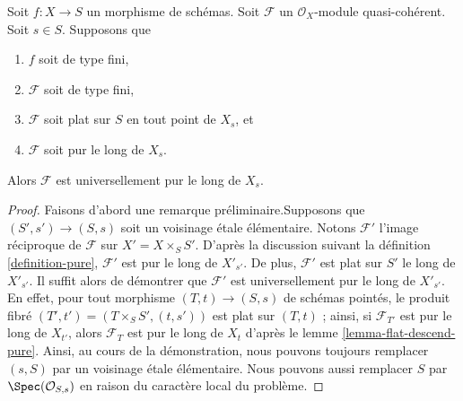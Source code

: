 \begin{lemma}
\label{lemma-finite-type-flat-pure-along-fibre-is-universal}
Soit $f : X \to S$ un morphisme de schémas.
Soit $\mathcal{F}$ un $\mathcal{O}_X$-module quasi-cohérent.
Soit $s \in S$.
Supposons que
\begin{enumerate}
\item $f$ soit de type fini,
\item $\mathcal{F}$ soit de type fini,
\item $\mathcal{F}$ soit plat sur $S$ en tout point de $X_s$, et
\item $\mathcal{F}$ soit pur le long de $X_s$.
\end{enumerate}
Alors $\mathcal{F}$ est universellement pur le long de $X_s$.
\end{lemma}

\begin{proof}
Faisons d'abord une remarque préliminaire.\newline Supposons que $(S', s') \to (S, s)$
soit un voisinage \'etale élémentaire. Notons $\mathcal{F}'$
l'image réciproque de $\mathcal{F}$ sur $X' = X \times_S S'$.
D'après la discussion suivant la
définition \ref{definition-pure},
$\mathcal{F}'$ est pur le long de $X'_{s'}$. De plus, $\mathcal{F}'$
est plat sur $S'$ le long de $X'_{s'}$. Il suffit alors de démontrer
que $\mathcal{F}'$ est universellement pur le long de $X'_{s'}$. En effet, pour
tout morphisme $(T, t) \to (S, s)$ de schémas pointés,
le produit fibré $(T', t') = (T \times_S S', (t, s'))$ est plat sur $(T, t)$ ;
ainsi, si $\mathcal{F}_{T'}$ est pur le long de $X_{t'}$, alors
$\mathcal{F}_T$ est pur le long de $X_t$ d'après le
lemme \ref{lemma-flat-descend-pure}.
Ainsi, au cours de la démonstration, nous pouvons toujours remplacer $(s, S)$ par un voisinage
\'etale élémentaire.
Nous pouvons aussi remplacer $S$ par $\Spec(\mathcal{O}_{S, s})$
en raison du caractère local du problème.


\end{proof}
